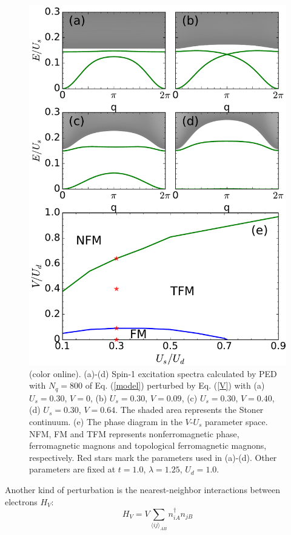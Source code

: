 \documentclass[amsmath,superscriptaddress,showpacs,aps,prb,twocolumn]{revtex4-1}
\begin{document}
\begin{figure}
\includegraphics[scale=0.46]{v_spectrum}
\caption{(color online). (a)-(d) Spin-1 excitation spectra calculated by PED with $N_q=800$ of Eq. (\ref{model}) perturbed by Eq. (\ref{V}) with (a) $U_s=0.30$, $V=0$, (b) $U_s=0.30$, $V=0.09$, (c) $U_s=0.30$, $V=0.40$, (d) $U_s=0.30$, $V=0.64$. The shaded area represents the Stoner continuum. (e) The phase diagram in the $V$-$U_s$ parameter space. NFM, FM and TFM represents nonferromagnetic phase, ferromagnetic magnons and topological ferromagnetic magnons, respectively. Red stars mark the parameters used in (a)-(d). Other parameters are fixed at $t=1.0$, $\lambda=1.25$, $U_d=1.0$.}
\label{vspectrum}
\end{figure}

\par Another kind of perturbation is the nearest-neighbor interactions between electrons $H_V$:
\begin{equation}\label{V}
H_{V}=V\sum_{\langle ij\rangle_{AB}}n_{iA}^\dagger n_{jB}
\end{equation}
\end{document}
